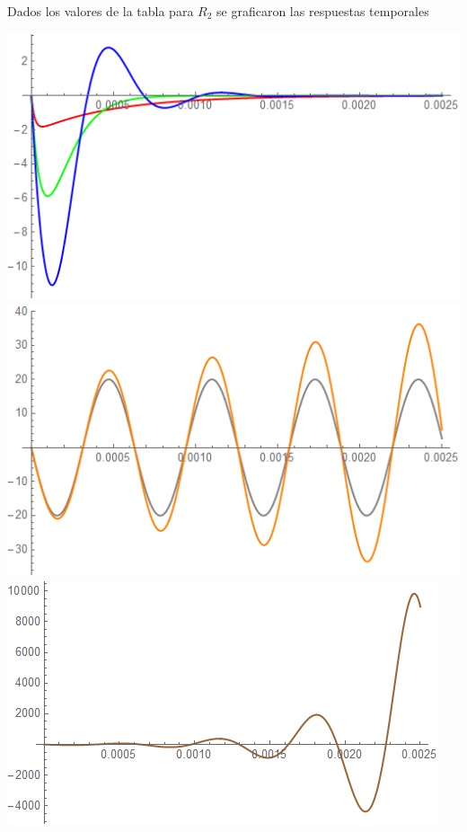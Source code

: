 \documentclass[10pt,a4paper]{article} %
\begin{document}
Dados los valores de la tabla para $R_2$ se graficaron las respuestas temporales
\begin{center}
	\includegraphics[scale=0.7]{respuestatemporal1}
	\includegraphics[scale=0.7]{respuestatemporal2}
	\includegraphics[scale=0.8]{respuestatemporal3}
\end{center}	
\end{document}
